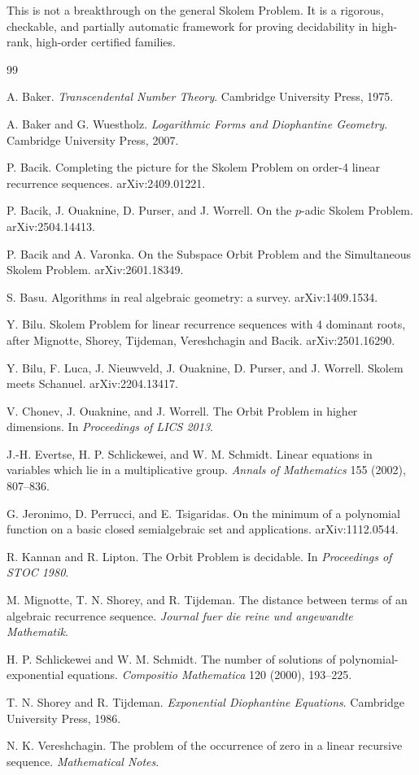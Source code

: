 \documentclass[11pt]{article}
\begin{document}
This is not a breakthrough on the general Skolem Problem. It is a rigorous, checkable, and partially automatic framework for proving decidability in high-rank, high-order certified families.

\begin{thebibliography}{99}

A. Baker.
\emph{Transcendental Number Theory}.
Cambridge University Press, 1975.

A. Baker and G. Wuestholz.
\emph{Logarithmic Forms and Diophantine Geometry}.
Cambridge University Press, 2007.

P. Bacik.
Completing the picture for the Skolem Problem on order-4 linear recurrence sequences.
arXiv:2409.01221.

P. Bacik, J. Ouaknine, D. Purser, and J. Worrell.
On the \(p\)-adic Skolem Problem.
arXiv:2504.14413.

P. Bacik and A. Varonka.
On the Subspace Orbit Problem and the Simultaneous Skolem Problem.
arXiv:2601.18349.

S. Basu.
Algorithms in real algebraic geometry: a survey.
arXiv:1409.1534.

Y. Bilu.
Skolem Problem for linear recurrence sequences with 4 dominant roots, after Mignotte, Shorey, Tijdeman, Vereshchagin and Bacik.
arXiv:2501.16290.

Y. Bilu, F. Luca, J. Nieuwveld, J. Ouaknine, D. Purser, and J. Worrell.
Skolem meets Schanuel.
arXiv:2204.13417.

V. Chonev, J. Ouaknine, and J. Worrell.
The Orbit Problem in higher dimensions.
In \emph{Proceedings of LICS 2013}.

J.-H. Evertse, H. P. Schlickewei, and W. M. Schmidt.
Linear equations in variables which lie in a multiplicative group.
\emph{Annals of Mathematics} 155 (2002), 807--836.

G. Jeronimo, D. Perrucci, and E. Tsigaridas.
On the minimum of a polynomial function on a basic closed semialgebraic set and applications.
arXiv:1112.0544.

R. Kannan and R. Lipton.
The Orbit Problem is decidable.
In \emph{Proceedings of STOC 1980}.

M. Mignotte, T. N. Shorey, and R. Tijdeman.
The distance between terms of an algebraic recurrence sequence.
\emph{Journal fuer die reine und angewandte Mathematik}.

H. P. Schlickewei and W. M. Schmidt.
The number of solutions of polynomial-exponential equations.
\emph{Compositio Mathematica} 120 (2000), 193--225.

T. N. Shorey and R. Tijdeman.
\emph{Exponential Diophantine Equations}.
Cambridge University Press, 1986.

N. K. Vereshchagin.
The problem of the occurrence of zero in a linear recursive sequence.
\emph{Mathematical Notes}.

\end{thebibliography}
\end{document}

